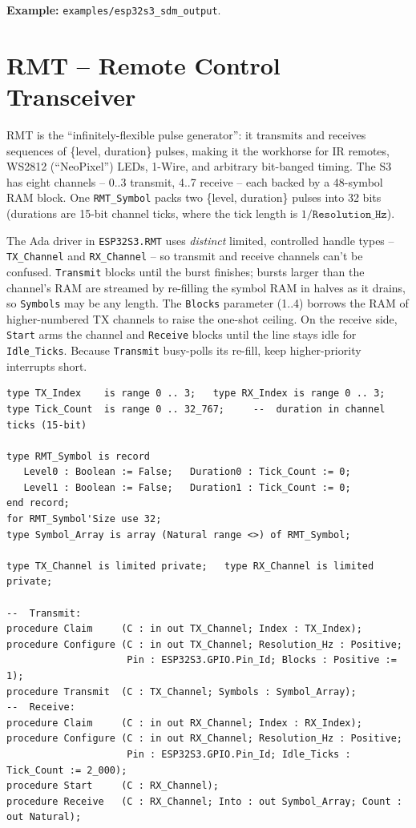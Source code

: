 \noindent\textbf{Example:} \texttt{examples/esp32s3\_sdm\_output}.

\section{RMT -- Remote Control Transceiver}
\label{app:int:rmt}

RMT is the ``infinitely-flexible pulse generator'': it transmits and receives
sequences of \{level, duration\} pulses, making it the workhorse for IR remotes,
WS2812 (``NeoPixel'') LEDs, 1-Wire, and arbitrary bit-banged timing. The S3 has
eight channels -- 0..3 transmit, 4..7 receive -- each backed by a 48-symbol RAM
block. One \texttt{RMT\_Symbol} packs two \{level, duration\} pulses into 32 bits
(durations are 15-bit channel ticks, where the tick length is
$1/\texttt{Resolution\_Hz}$).

The Ada driver in \texttt{ESP32S3.RMT} uses \emph{distinct} limited, controlled
handle types -- \texttt{TX\_Channel} and \texttt{RX\_Channel} -- so transmit and
receive channels can't be confused. \texttt{Transmit} blocks until the burst
finishes; bursts larger than the channel's RAM are streamed by re-filling the
symbol RAM in halves as it drains, so \texttt{Symbols} may be any length. The
\texttt{Blocks} parameter (1..4) borrows the RAM of higher-numbered TX channels
to raise the one-shot ceiling. On the receive side, \texttt{Start} arms the
channel and \texttt{Receive} blocks until the line stays idle for
\texttt{Idle\_Ticks}. Because \texttt{Transmit} busy-polls its re-fill, keep
higher-priority interrupts short.

\begin{lstlisting}
type TX_Index    is range 0 .. 3;   type RX_Index is range 0 .. 3;
type Tick_Count  is range 0 .. 32_767;     --  duration in channel ticks (15-bit)

type RMT_Symbol is record
   Level0 : Boolean := False;   Duration0 : Tick_Count := 0;
   Level1 : Boolean := False;   Duration1 : Tick_Count := 0;
end record;
for RMT_Symbol'Size use 32;
type Symbol_Array is array (Natural range <>) of RMT_Symbol;

type TX_Channel is limited private;   type RX_Channel is limited private;

--  Transmit:
procedure Claim     (C : in out TX_Channel; Index : TX_Index);
procedure Configure (C : in out TX_Channel; Resolution_Hz : Positive;
                     Pin : ESP32S3.GPIO.Pin_Id; Blocks : Positive := 1);
procedure Transmit  (C : TX_Channel; Symbols : Symbol_Array);
--  Receive:
procedure Claim     (C : in out RX_Channel; Index : RX_Index);
procedure Configure (C : in out RX_Channel; Resolution_Hz : Positive;
                     Pin : ESP32S3.GPIO.Pin_Id; Idle_Ticks : Tick_Count := 2_000);
procedure Start     (C : RX_Channel);
procedure Receive   (C : RX_Channel; Into : out Symbol_Array; Count : out Natural);
\end{lstlisting}

